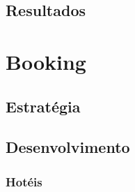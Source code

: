 \documentclass[a4paper,10pt]{article}
\begin{document}
\newpage

\subsection{Resultados}

\newpage

\section{Booking}

\subsection{Estratégia}

\subsection{Desenvolvimento}

\newpage

\subsubsection{Hotéis}
\end{document}
